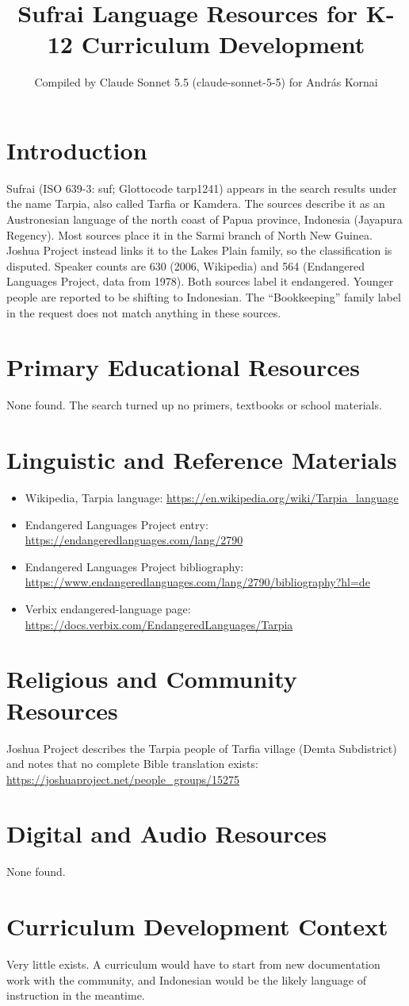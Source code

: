 \documentclass[12pt]{article}
\title{Sufrai Language Resources for K-12 Curriculum Development}
\author{Compiled by Claude Sonnet 5.5 (claude-sonnet-5-5) for Andr\'as Kornai}
\date{}
\begin{document}
\maketitle

\section{Introduction}
Sufrai (ISO 639-3: suf; Glottocode tarp1241) appears in the search results under the name Tarpia, also called Tarfia or Kamdera. The sources describe it as an Austronesian language of the north coast of Papua province, Indonesia (Jayapura Regency). Most sources place it in the Sarmi branch of North New Guinea. Joshua Project instead links it to the Lakes Plain family, so the classification is disputed. Speaker counts are 630 (2006, Wikipedia) and 564 (Endangered Languages Project, data from 1978). Both sources label it endangered. Younger people are reported to be shifting to Indonesian. The ``Bookkeeping'' family label in the request does not match anything in these sources.

\section{Primary Educational Resources}
None found. The search turned up no primers, textbooks or school materials.

\section{Linguistic and Reference Materials}
\begin{itemize}
\item Wikipedia, Tarpia language: \url{https://en.wikipedia.org/wiki/Tarpia_language}
\item Endangered Languages Project entry: \url{https://endangeredlanguages.com/lang/2790}
\item Endangered Languages Project bibliography: \url{https://www.endangeredlanguages.com/lang/2790/bibliography?hl=de}
\item Verbix endangered-language page: \url{https://docs.verbix.com/EndangeredLanguages/Tarpia}
\end{itemize}

\section{Religious and Community Resources}
Joshua Project describes the Tarpia people of Tarfia village (Demta Subdistrict) and notes that no complete Bible translation exists: \url{https://joshuaproject.net/people_groups/15275}

\section{Digital and Audio Resources}
None found.

\section{Curriculum Development Context}
Very little exists. A curriculum would have to start from new documentation work with the community, and Indonesian would be the likely language of instruction in the meantime.
\end{document}
